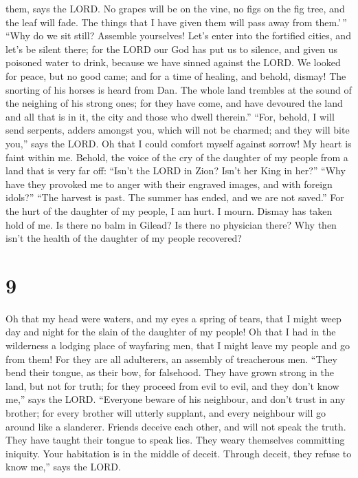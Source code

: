 them, says the LORD. No grapes will be on the vine, no figs on the fig
tree, and the leaf will fade. The things that I have given them will
pass away from them.'\,''  ``Why do we sit still? Assemble
yourselves! Let's enter into the fortified cities, and let's be silent
there; for the LORD our God has put us to silence, and given us poisoned
water to drink, because we have sinned against the LORD. 
We looked for peace, but no good came; and for a time of healing, and
behold, dismay!  The snorting of his horses is heard from
Dan. The whole land trembles at the sound of the neighing of his strong
ones; for they have come, and have devoured the land and all that is in
it, the city and those who dwell therein.''  ``For, behold,
I will send serpents, adders amongst you, which will not be charmed; and
they will bite you,'' says the LORD.  Oh that I could
comfort myself against sorrow! My heart is faint within me.
 Behold, the voice of the cry of the daughter of my people
from a land that is very far off: ``Isn't the LORD in Zion? Isn't her
King in her?'' ``Why have they provoked me to anger with their engraved
images, and with foreign idols?''  ``The harvest is past.
The summer has ended, and we are not saved.''  For the hurt
of the daughter of my people, I am hurt. I mourn. Dismay has taken hold
of me.  Is there no balm in Gilead? Is there no physician
there? Why then isn't the health of the daughter of my people recovered?

\hypertarget{section-8}{%
\section{9}\label{section-8}}

 Oh that my head were waters, and my eyes a spring of tears,
that I might weep day and night for the slain of the daughter of my
people!  Oh that I had in the wilderness a lodging place of
wayfaring men, that I might leave my people and go from them! For they
are all adulterers, an assembly of treacherous men.  ``They
bend their tongue, as their bow, for falsehood. They have grown strong
in the land, but not for truth; for they proceed from evil to evil, and
they don't know me,'' says the LORD.  ``Everyone beware of
his neighbour, and don't trust in any brother; for every brother will
utterly supplant, and every neighbour will go around like a slanderer.
 Friends deceive each other, and will not speak the truth.
They have taught their tongue to speak lies. They weary themselves
committing iniquity.  Your habitation is in the middle of
deceit. Through deceit, they refuse to know me,'' says the LORD.

